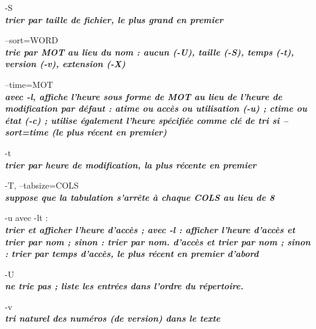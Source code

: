 \documentclass{article}
\begin{document}
       \par-S\\          \textit{\textbf{ trier par taille de fichier, le plus grand en premier}}\\

       \par--sort=WORD\\ 
              \textit{\textbf{trie par MOT au lieu du nom : aucun (-U), taille (-S), temps (-t),
              version (-v), extension (-X)}}\\

       \par --time=MOT\\ 
              \textit{\textbf{avec -l, affiche l'heure sous forme de MOT au lieu de l'heure de modification par défaut :
              atime ou accès ou utilisation (-u) ; ctime ou état (-c) ; utilise également
              l'heure spécifiée comme clé de tri si --sort=time (le plus récent en premier)}}\\

   

        \par -t \\      \textit{\textbf{trier par heure de modification, la plus récente en premier}}\\

      \par -T, --tabsize=COLS\\  
              \textit{\textbf{suppose que la tabulation s'arrête à chaque COLS au lieu de 8}}\\

         \par-u avec -lt :\\    \textit{\textbf{trier et afficher l'heure d'accès ; avec -l : afficher l'heure d'accès et trier par nom ; sinon : trier par nom.
              d'accès et trier par nom ; sinon : trier par temps d'accès, le plus récent en premier
              d'abord}}\\

      \par -U \\
		 \textit{\textbf{ne trie pas ; liste les entrées dans l'ordre du répertoire.}}\\

       \par-v\\
		 \textit{\textbf{ tri naturel des numéros (de version) dans le texte}}\\
\end{document}
